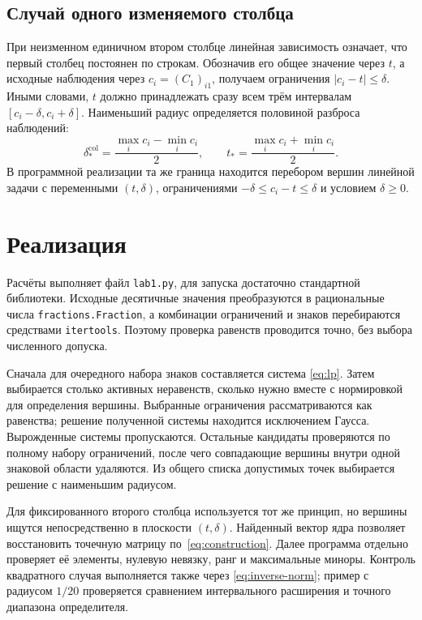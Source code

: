 \documentclass[12pt,a4paper]{article}
\begin{document}
\subsection{Случай одного изменяемого столбца}

При неизменном единичном втором столбце линейная зависимость
означает, что первый столбец постоянен по строкам.
Обозначив его общее значение через $t$, а исходные наблюдения
через $c_i=(C_1)_{i1}$, получаем ограничения $|c_i-t|\leq\delta$.
Иными словами, $t$ должно принадлежать сразу всем трём интервалам
$[c_i-\delta,c_i+\delta]$. Наименьший радиус определяется
половиной разброса наблюдений:
\begin{equation}
\delta_*^{\mathrm{col}}=
\frac{\max_i c_i-\min_i c_i}{2},
\qquad
t_*=\frac{\max_i c_i+\min_i c_i}{2}.
\label{eq:single-column}
\end{equation}
В программной реализации та же граница находится перебором вершин
линейной задачи с переменными $(t,\delta)$, ограничениями
$-\delta\leq c_i-t\leq\delta$ и условием $\delta\geq0$.

\section{Реализация}

Расчёты выполняет файл \texttt{lab1.py}, для запуска достаточно стандартной библиотеки.
Исходные десятичные значения преобразуются в рациональные числа
\texttt{fractions.Fraction}, а комбинации ограничений и знаков
перебираются средствами \texttt{itertools}. Поэтому проверка
равенств проводится точно, без выбора численного допуска.

Сначала для очередного набора знаков составляется система
\eqref{eq:lp}. Затем выбирается столько активных неравенств,
сколько нужно вместе с нормировкой для определения вершины.
Выбранные ограничения рассматриваются как равенства; решение
полученной системы находится исключением Гаусса. Вырожденные
системы пропускаются. Остальные кандидаты проверяются по полному
набору ограничений, после чего совпадающие вершины внутри одной
знаковой области удаляются. Из общего списка допустимых точек
выбирается решение с наименьшим радиусом.

Для фиксированного второго столбца используется тот же принцип,
но вершины ищутся непосредственно в плоскости $(t,\delta)$.
Найденный вектор ядра позволяет восстановить точечную матрицу
по~\eqref{eq:construction}. Далее программа отдельно проверяет
её элементы, нулевую невязку, ранг и максимальные миноры.
Контроль квадратного случая выполняется также через
\eqref{eq:inverse-norm}; пример с радиусом $1/20$ проверяется
сравнением интервального расширения и точного диапазона определителя.
\end{document}

